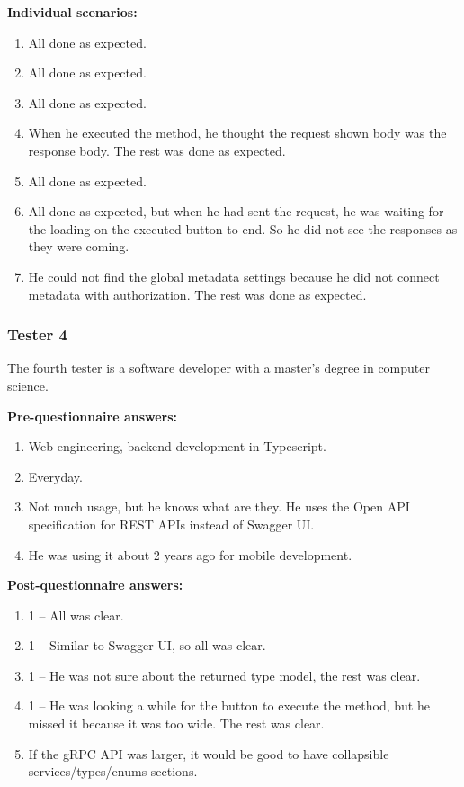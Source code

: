 \textbf{Individual scenarios:}
\begin{enumerate}
    \item All done as expected.
    \item All done as expected.
    \item All done as expected.
    \item When he executed the method, he thought the request shown body was the response body.
    The rest was done as expected.
    \item All done as expected.
    \item All done as expected, but when he had sent the request, he was waiting for the loading on the executed button to end.
    So he did not see the responses as they were coming.
    \item He could not find the global metadata settings because he did not connect metadata with authorization.
    The rest was done as expected.
\end{enumerate}

\subsubsection{Tester 4}
The fourth tester is a software developer with a master's degree in computer science.

\textbf{Pre-questionnaire answers:}
\begin{enumerate}
    \item Web engineering, backend development in Typescript.
    \item Everyday.
    \item Not much usage, but he knows what are they.
    He uses the Open API specification for REST APIs instead of Swagger UI\@.
    \item He was using it about 2 years ago for mobile development.
\end{enumerate}

\textbf{Post-questionnaire answers:}
\begin{enumerate}
    \item 1 -- All was clear.
    \item 1 -- Similar to Swagger UI, so all was clear.
    \item 1 -- He was not sure about the returned type model, the rest was clear.
    \item 1 -- He was looking a while for the button to execute the method, but he missed it because it was too wide.
    The rest was clear.
    \item If the gRPC API was larger, it would be good to have collapsible services/types/enums sections.
\end{enumerate}

